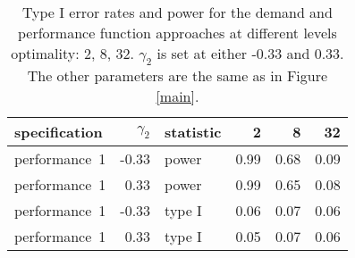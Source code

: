 \begin{table}[ht]
\centering
\begingroup\footnotesize
\begin{tabular}{lrlrrr}
  \hline
specification & $\gamma_2$ & statistic & 2 & 8 & 32 \\ 
  \hline
performance~1 & -0.33 & power & 0.99 & 0.68 & 0.09 \\ 
  performance~1 & 0.33 & power & 0.99 & 0.65 & 0.08 \\ 
  performance~1 & -0.33 & type I & 0.06 & 0.07 & 0.06 \\ 
  performance~1 & 0.33 & type I & 0.05 & 0.07 & 0.06 \\ 
   \hline
\end{tabular}
\endgroup
\caption{Type I error rates and power for the demand and 
  performance function approaches at different levels optimality: 
  2, 8, 32. $\gamma_2$ is set at either -0.33 and 0.33. The other 
  parameters are the same as in Figure \ref{main}.} 
\label{bootstrap-table}
\end{table}

